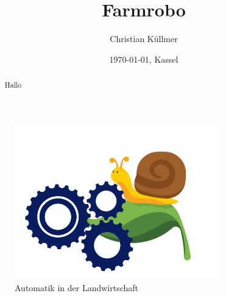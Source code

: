 \documentclass[]{article}
\title{Farmrobo}
\author{Christian Küllmer}
\date{\today{}, Kassel}
\begin{document}
\maketitle
\begin{figure}[H]
	\centering
	\includegraphics[width=0.8\textwidth]{DeckblattFarmrobo.jpg}
	\caption{Automatik in der Landwirtschaft}
	\label{img:grafik-dummy}
\end{figure}
\newpage
\tableofcontents


\begin{abstract}
	Hallo
\end{abstract}
\end{document}
